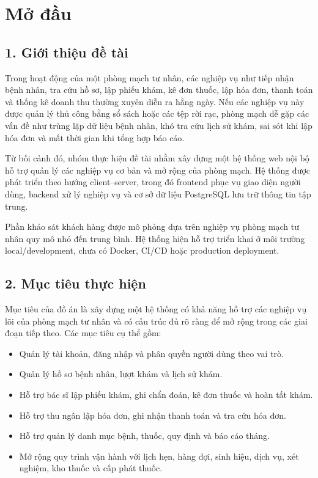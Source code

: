 \chapter*{Mở đầu}

\section*{1. Giới thiệu đề tài}

Trong hoạt động của một phòng mạch tư nhân, các nghiệp vụ như tiếp nhận bệnh nhân, tra cứu hồ sơ, lập phiếu khám, kê đơn thuốc, lập hóa đơn, thanh toán và thống kê doanh thu thường xuyên diễn ra hằng ngày. Nếu các nghiệp vụ này được quản lý thủ công bằng sổ sách hoặc các tệp rời rạc, phòng mạch dễ gặp các vấn đề như trùng lặp dữ liệu bệnh nhân, khó tra cứu lịch sử khám, sai sót khi lập hóa đơn và mất thời gian khi tổng hợp báo cáo.

Từ bối cảnh đó, nhóm thực hiện đề tài \textbf{\projecttitle} nhằm xây dựng một hệ thống web nội bộ hỗ trợ quản lý các nghiệp vụ cơ bản và mở rộng của phòng mạch. Hệ thống được phát triển theo hướng client--server, trong đó frontend phục vụ giao diện người dùng, backend xử lý nghiệp vụ và cơ sở dữ liệu PostgreSQL lưu trữ thông tin tập trung.

 Phần khảo sát khách hàng được mô phỏng dựa trên nghiệp vụ phòng mạch tư nhân quy mô nhỏ đến trung bình. Hệ thống hiện hỗ trợ triển khai ở môi trường local/development, chưa có Docker, CI/CD hoặc production deployment.

\section*{2. Mục tiêu thực hiện}

Mục tiêu của đồ án là xây dựng một hệ thống có khả năng hỗ trợ các nghiệp vụ lõi của phòng mạch tư nhân và có cấu trúc đủ rõ ràng để mở rộng trong các giai đoạn tiếp theo. Các mục tiêu cụ thể gồm:

\begin{itemize}
    \item Quản lý tài khoản, đăng nhập và phân quyền người dùng theo vai trò.
    \item Quản lý hồ sơ bệnh nhân, lượt khám và lịch sử khám.
    \item Hỗ trợ bác sĩ lập phiếu khám, ghi chẩn đoán, kê đơn thuốc và hoàn tất khám.
    \item Hỗ trợ thu ngân lập hóa đơn, ghi nhận thanh toán và tra cứu hóa đơn.
    \item Hỗ trợ quản lý danh mục bệnh, thuốc, quy định và báo cáo tháng.
    \item Mở rộng quy trình vận hành với lịch hẹn, hàng đợi, sinh hiệu, dịch vụ, xét nghiệm, kho thuốc và cấp phát thuốc.
\end{itemize}

